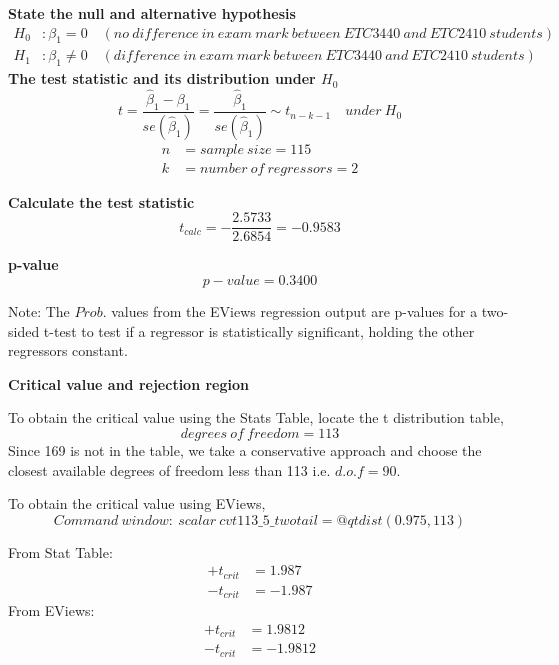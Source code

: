 \documentclass[12pt]{report}
\begin{document}
\justify \noindent \textbf{State the null and alternative hypothesis}
\begin{align*}
H_0&: \beta_1 = 0 \quad (no\ difference\ in\ exam\ mark\ between\ ETC3440\ and\ ETC2410\ students) \\
H_1&: \beta_1 \neq 0 \quad (difference\ in\ exam\ mark\ between\ ETC3440\ and\ ETC2410\ students)
\end{align*}
\noindent \textbf{The test statistic and its distribution under $H_0$}
$$t = \dfrac{\hat{\beta}_1 - \beta_1}{se(\hat{\beta}_1)} = \dfrac{\hat{\beta}_1}{se(\hat{\beta}_1)} \sim t_{n-k-1} \quad under\ H_0$$
\begin{align*}
n &= sample\ size = 115 \\
k &= number\ of\ regressors = 2
\end{align*}

\noindent \textbf{Calculate the test statistic}
$$t_{calc} = -\dfrac{2.5733}{2.6854} = -0.9583$$
\begin{figure}[H]
	\centering
\end{figure}
\vspace{-\baselineskip}
\noindent \textbf{p-value}
$$p-value = 0.3400$$

\noindent Note: The $Prob.$ values from the EViews regression output are p-values for a two-sided t-test to test if a regressor is statistically significant, holding the other regressors constant.

\noindent \textbf{Critical value and rejection region}

\noindent To obtain the critical value using the Stats Table, locate the t distribution table,
$$degrees\ of\ freedom = 113$$
\noindent Since 169 is not in the table, we take a conservative approach and choose the closest available degrees of freedom less than 113 i.e. $d.o.f=90$. 
\begin{figure}[H]
	\centering
\end{figure}
\vspace{-\baselineskip}
\noindent To obtain the critical value using EViews,
$$Command\ window:\ scalar\ cvt113\_5\_twotail=@qtdist(0.975,113)$$
\begin{figure}[H]
	\centering
\end{figure}
\vspace{-\baselineskip}
\begin{figure}[H]
	\centering
\end{figure}
\vspace{-\baselineskip}
\begin{figure}[H]
	\centering
\end{figure}
\vspace{-\baselineskip}
\noindent From Stat Table:
\begin{align*}
+t_{crit} &= 1.987 \\
-t_{crit} &= -1.987
\end{align*}
\noindent From EViews:
\begin{align*}
+t_{crit} &= 1.9812 \\
-t_{crit} &= -1.9812
\end{align*}
\end{document}
